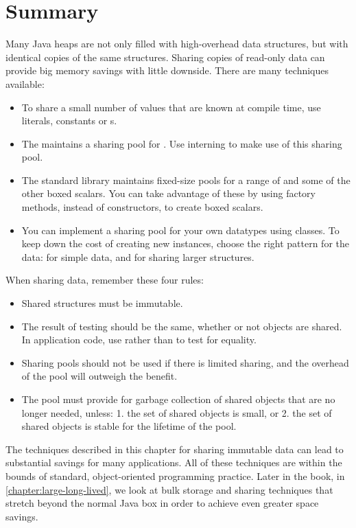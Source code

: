 \section{Summary} 
Many Java heaps are not only filled with high-overhead data structures, but with
identical copies of the same structures. Sharing copies of read-only
data can provide big memory savings with little downside. There are many
techniques available:

\begin{itemize}
  \item To share a small number of values that are known at compile time, use
   literals,  constants or s.
  \item The \jre maintains a sharing
  pool for . Use  interning to make use of this
  sharing pool.
  \item The standard library maintains fixed-size pools for
   a range of  and some of the other boxed scalars. You
   can take advantage of these by using  factory methods, instead
   of constructors, to create boxed scalars.
   \item You can implement a sharing pool for your own datatypes using
    classes. To keep down the cost of creating new instances, choose
   the right pattern for the data:  for
   simple data, and  for sharing larger structures.
\end{itemize}


When sharing data, remember these four rules:
\begin{itemize}
  \item Shared structures must be immutable.
  \item The result of  testing should be the same, whether or
not objects are shared. In application code, use  rather than
\code{==} to test for equality.
  \item Sharing pools should not be used if there is limited sharing, and the
  overhead of the pool will outweigh the benefit.
  \item The pool must provide for garbage collection of shared objects
  that are no longer needed, unless: 1. the set of shared objects is
  small, or 2. the set of shared objects is stable for the lifetime of the
  pool.
\end{itemize}

The techniques described in this chapter for sharing immutable
data can lead to substantial savings for many applications.  All of these
techniques are within the bounds of standard, object-oriented programming
practice. Later in the book, in \autoref{chapter:large-long-lived}, we look at
bulk storage and sharing techniques that stretch beyond the normal Java box in
order to achieve even greater space savings. 







